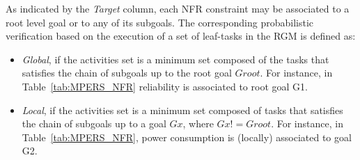 
As indicated by the \textit{Target} column, each NFR constraint may be associated to a root level goal or to any of its subgoals. The corresponding probabilistic verification based on the execution of a set of leaf-tasks in the RGM is defined as:

\begin{itemize}

\item \textit{Global}, if the activities set is a minimum set composed of the tasks that satisfies the chain of subgoals up to the root goal $Groot$. For instance, in Table~\ref{tab:MPERS_NFR} reliability is associated to root goal G1.
\medskip

\item \textit{Local}, if the activities set is a minimum set composed of tasks that satisfies the chain of subgoals up to a goal $Gx$, where $Gx != Groot$. For instance, in Table~\ref{tab:MPERS_NFR}, power consumption is (locally) associated to goal G2.
\medskip

\end{itemize}


%
%


%
%
%



